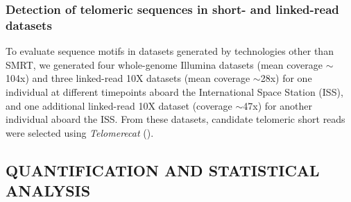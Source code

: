 \documentclass{article}
\newcommand{\citep}[1]{(\cite{#1})}
\begin{document}
\subsubsection*{Detection of telomeric sequences in short- and linked-read datasets}
To evaluate sequence motifs in datasets generated by technologies other than SMRT,
we generated four whole-genome Illumina datasets (mean coverage $\sim$104x)
and three linked-read 10X datasets (mean coverage $\sim$28x)
for one individual at different timepoints aboard the International Space Station (ISS),
and one additional linked-read 10X dataset (coverage $\sim$47x) for another individual aboard the ISS.
From these datasets, candidate telomeric short reads were selected using \textit{Telomerecat} \citep{telomerecat}.

\subsection*{QUANTIFICATION AND STATISTICAL ANALYSIS} 
\end{document}
